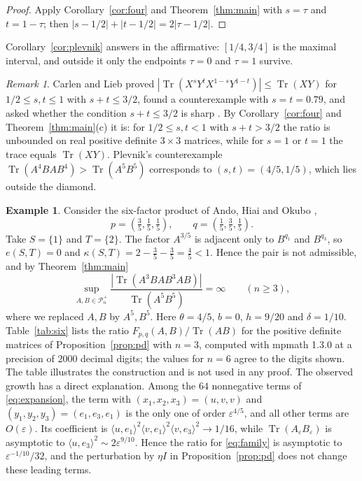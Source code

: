 \documentclass{amsart}
\theoremstyle{definition}
\newtheorem{example}[theorem]{Example}
\theoremstyle{remark}
\newtheorem{remark}[theorem]{Remark}
\numberwithin{equation}{section}
\newcommand{\Tr}{\operatorname{Tr}}
\newcommand{\PD}{\mathcal{P}_n^{+}}
\newcommand{\cut}{\kappa}
\begin{document}
\begin{proof}
Apply Corollary~\ref{cor:four} and Theorem~\ref{thm:main} with $s=\tau$ and $t=1-\tau$; then $|s-1/2|+|t-1/2|=2|\tau-1/2|$.
\end{proof}

Corollary~\ref{cor:plevnik} answers \cite[Question~2.3]{Pl} in the affirmative: $[1/4,3/4]$ is the maximal interval, and outside it only the endpoints $\tau=0$ and $\tau=1$ survive.

\begin{remark}\label{rem:CL}
Carlen and Lieb proved $|\Tr(X^sY^tX^{1-s}Y^{1-t})|\le\Tr(XY)$ for $1/2\le s,t\le 1$ with $s+t\le 3/2$, found a counterexample with $s=t=0.79$, and asked whether the condition $s+t\le 3/2$ is sharp \cite[Section~IV]{CL}. By Corollary~\ref{cor:four} and Theorem~\ref{thm:main}(c) it is: for $1/2\le s,t<1$ with $s+t>3/2$ the ratio is unbounded on real positive definite $3\times 3$ matrices, while for $s=1$ or $t=1$ the trace equals $\Tr(XY)$. Plevnik's counterexample $\Tr(A^4BAB^4)>\Tr(A^5B^5)$ \cite[Example~2.1]{Pl} corresponds to $(s,t)=(4/5,1/5)$, which lies outside the diamond.
\end{remark}

\begin{example}\label{ex:six}
Consider the six-factor product of Ando, Hiai and Okubo \cite[p.~312]{AHO},
\[
p=(\tfrac35,\tfrac15,\tfrac15),\qquad q=(\tfrac15,\tfrac35,\tfrac15).
\]
Take $S=\{1\}$ and $T=\{2\}$. The factor $A^{3/5}$ is adjacent only to $B^{q_1}$ and $B^{q_3}$, so $e(S,T)=0$ and $\cut(S,T)=2-\tfrac35-\tfrac35=\tfrac45<1$. Hence the pair is not admissible, and by Theorem~\ref{thm:main}
\[
\sup_{A,B\in\PD}\frac{|\Tr(A^{3}BAB^{3}AB)|}{\Tr(A^5B^5)}=\infty\qquad(n\ge 3),
\]
where we replaced $A,B$ by $A^5,B^5$. Here $\theta=4/5$, $b=0$, $h=9/20$ and $\delta=1/10$. Table~\ref{tab:six} lists the ratio $F_{p,q}(A,B)/\Tr(AB)$ for the positive definite matrices of Proposition~\ref{prop:pd} with $n=3$, computed with mpmath 1.3.0 at a precision of $2000$ decimal digits; the values for $n=6$ agree to the digits shown. The table illustrates the construction and is not used in any proof. The observed growth has a direct explanation. Among the $64$ nonnegative terms of \eqref{eq:expansion}, the term with $(x_1,x_2,x_3)=(u,v,v)$ and $(y_1,y_2,y_3)=(e_1,e_3,e_1)$ is the only one of order $\varepsilon^{4/5}$, and all other terms are $O(\varepsilon)$. Its coefficient is $\langle u,e_1\rangle^2\langle v,e_1\rangle^2\langle v,e_3\rangle^2\to 1/16$, while $\Tr(A_\varepsilon B_\varepsilon)$ is asymptotic to $\langle u,e_3\rangle^2\sim 2\varepsilon^{9/10}$. Hence the ratio for \eqref{eq:family} is asymptotic to $\varepsilon^{-1/10}/32$, and the perturbation by $\eta I$ in Proposition~\ref{prop:pd} does not change these leading terms.
\end{example}
\end{document}
